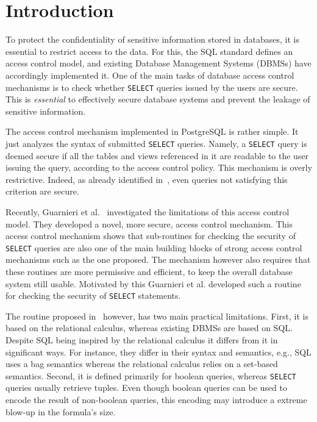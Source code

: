 \section{Introduction}
To protect the confidentiality of sensitive information stored in databases, it is essential to restrict access to the data.
%
For this, the SQL standard defines an access control model, and existing Database Management Systems (DBMSs) have accordingly implemented it. 
%
One of the main tasks of database access control mechanisms is to check whether \texttt{SELECT} queries issued by the users are secure.
%
This is \emph{essential} to effectively secure database systems and prevent the leakage of sensitive information.

The access control mechanism implemented in PostgreSQL is rather simple.
%
It just analyzes the syntax of submitted \texttt{SELECT} queries.
%
Namely, a \texttt{SELECT} query is deemed secure if all the tables and views referenced in it are readable to the user issuing the query, according to the access control policy.
%
This mechanism is overly restrictive.
%
Indeed, as already identified in~\cite{...}, even queries not satisfying this criterion are secure.

Recently, Guarnieri et al.~\cite{guarnieri2016strong} investigated the limitations of this access control model. 
%
They developed a novel, more secure, access control mechanism.
%
This access control mechanism shows that sub-routines for checking the security of \texttt{SELECT} queries are also one of the main building blocks of strong access control mechanisms such as the one proposed.
%
The mechanism however also requires that these routines are more permissive and efficient, to keep the overall database system still usable.
%
Motivated by this Guarnieri et al. developed such a routine for checking the security of \texttt{SELECT} statements.

The routine proposed in~\cite{guarnieri2016strong} however, has two main practical limitations.
%
First, it is based on the relational calculus, whereas existing DBMSs are based on SQL. Despite SQL being inspired by the relational calculus it differs from it in significant ways. For instance, they differ in their syntax and semantics, e.g., SQL uses a bag semantics whereas the relational calculus relies on a set-based semantics.
%
Second, it is defined primarily for boolean queries, whereas \texttt{SELECT} queries usually retrieve tuples.
%
Even though boolean queries can be used to encode the result of non-boolean queries, this encoding may introduce a extreme blow-up in the formula's size.

